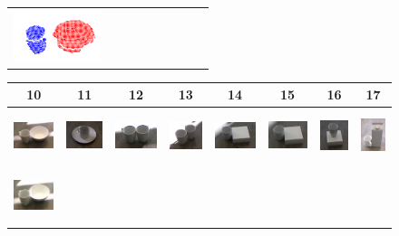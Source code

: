 \begin{figure}[h!]
\begin{tabular}{ccccccccc}
    \includegraphics[height=1.5cm]{pictures/93.png}\\
    \end{tabular}
      \hspace*{-2.5cm}  
    \begin{tabular}{cccccccc}
      \hline
      10 & 11 & 12 & 13 & 14 & 15 & 16 & 17\\
      \hline
      \hline
    \includegraphics[height=1.5cm]{pictures/101.jpg}&
    \includegraphics[height=1.5cm]{pictures/111.jpg}&
    \includegraphics[height=1.5cm]{pictures/121.jpg}&
    \includegraphics[height=1.5cm]{pictures/131.jpg}&
    \includegraphics[height=1.5cm]{pictures/141.jpg}&
    \includegraphics[height=1.5cm]{pictures/151.jpg}&
    \includegraphics[height=1.5cm]{pictures/161.jpg}&
    \includegraphics[height=1.5cm]{pictures/171.jpg}\\ \includegraphics[height=1.5cm]{pictures/102.jpg}&

\end{tabular}
\end{figure}

